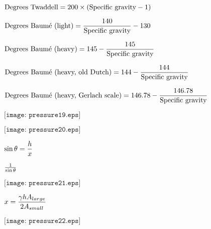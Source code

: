 \documentclass[12pt,a4paper,margin=2cm]{book}
\def\lthtmlcheckvsize{\ifdim\ht\sizebox<\vsize 
  \ifdim\wd\sizebox<\hsize\expandafter\hfill\fi \expandafter\vfill
  \else\expandafter\vss\fi}%
\begin{document}
{\newpage\clearpage
{}%
$\displaystyle \hbox{Degrees Twaddell} = 200 \times (\hbox{Specific gravity} - 1)$%
\lthtmlindisplaymathZ
\lthtmlcheckvsize\clearpage}

{\newpage\clearpage
{}%
$\displaystyle \hbox{Degrees Baum\'e (light)} = {140 \over \hbox{Specific gravity}} - 130$%
\lthtmlindisplaymathZ
\lthtmlcheckvsize\clearpage}

{\newpage\clearpage
{}%
$\displaystyle \hbox{Degrees Baum\'e (heavy)} = 145 - {145 \over \hbox{Specific gravity}}$%
\lthtmlindisplaymathZ
\lthtmlcheckvsize\clearpage}

{\newpage\clearpage
{}%
$\displaystyle \hbox{Degrees Baum\'e (heavy, old Dutch)} = 144 - {144 \over \hbox{Specific gravity}}$%
\lthtmlindisplaymathZ
\lthtmlcheckvsize\clearpage}

{\newpage\clearpage
{}%
$\displaystyle \hbox{Degrees Baum\'e (heavy, Gerlach scale)} = 146.78 - {146.78 \over \hbox{Specific gravity}}$%
\lthtmlindisplaymathZ
\lthtmlcheckvsize\clearpage}

{\newpage\clearpage
{}%
$\displaystyle \texttt{[image: pressure19.eps]}$%
\lthtmlindisplaymathZ
\lthtmlcheckvsize\clearpage}

{\newpage\clearpage
{}%
$\displaystyle \texttt{[image: pressure20.eps]}$%
\lthtmlindisplaymathZ
\lthtmlcheckvsize\clearpage}

{\newpage\clearpage
{}%
$\displaystyle \sin \theta = {h \over x}$%
\lthtmlindisplaymathZ
\lthtmlcheckvsize\clearpage}

{\newpage\clearpage
{}%
$ 1 \over {\sin \theta}$%
\lthtmlindisplaymathZ
\lthtmlcheckvsize\clearpage}

{\newpage\clearpage
{}%
$\displaystyle \texttt{[image: pressure21.eps]}$%
\lthtmlindisplaymathZ
\lthtmlcheckvsize\clearpage}

{\newpage\clearpage
{}%
$\displaystyle x = {{\gamma h} A_{large} \over {2 A_{small}}}$%
\lthtmlindisplaymathZ
\lthtmlcheckvsize\clearpage}

{\newpage\clearpage
{}%
$\displaystyle \texttt{[image: pressure22.eps]}$%
\lthtmlindisplaymathZ
\lthtmlcheckvsize\clearpage}
\end{document}
